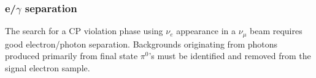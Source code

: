 %


\subsubsection{e/$\gamma$ separation}
\label{sec_egam}

The search for a CP violation phase using $\nu_e$ appearance 
in a $\nu_\mu$ beam requires good electron/photon separation.
Backgrounds originating from photons produced primarily from 
final state $\pi^0$'s must be identified and removed from the signal
electron sample. 

